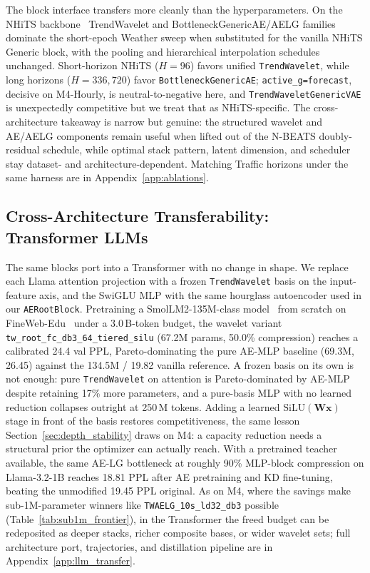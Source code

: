 \documentclass{article}
\begin{document}
The block interface transfers more cleanly than the hyperparameters. On the NHiTS backbone~\citep{challu2023nhits} TrendWavelet and BottleneckGenericAE/AELG families dominate the short-epoch Weather sweep when substituted for the vanilla NHiTS Generic block, with the pooling and hierarchical interpolation schedules unchanged. Short-horizon NHiTS ($H=96$) favors unified \texttt{TrendWavelet}, while long horizons ($H=336, 720$) favor \texttt{BottleneckGenericAE}; \texttt{active\_g=forecast}, decisive on M4-Hourly, is neutral-to-negative here, and \texttt{TrendWaveletGenericVAE} is unexpectedly competitive but we treat that as NHiTS-specific. The cross-architecture takeaway is narrow but genuine: the structured wavelet and AE/AELG components remain useful when lifted out of the N-BEATS doubly-residual schedule, while optimal stack pattern, latent dimension, and scheduler stay dataset- and architecture-dependent. Matching Traffic horizons under the same harness are in Appendix~\ref{app:ablations}.

\subsection{Cross-Architecture Transferability: Transformer LLMs}
\label{sec:transfer_llm}

The same blocks port into a Transformer with no change in shape. We replace each Llama attention projection with a frozen \texttt{TrendWavelet} basis on the input-feature axis, and the SwiGLU MLP with the same hourglass autoencoder used in our \texttt{AERootBlock}. Pretraining a SmolLM2-135M-class model~\citep{allal2025smollm2} from scratch on FineWeb-Edu~\citep{penedo2024fineweb} under a 3.0\,B-token budget, the wavelet variant \texttt{tw\_root\_fc\_db3\_64\_tiered\_silu} (67.2M params, 50.0\% compression) reaches a calibrated 24.4 val PPL, Pareto-dominating the pure AE-MLP baseline (69.3M, 26.45) against the 134.5M / 19.82 vanilla reference. A frozen basis on its own is not enough: pure \texttt{TrendWavelet} on attention is Pareto-dominated by AE-MLP despite retaining 17\% more parameters, and a pure-basis MLP with no learned reduction collapses outright at 250\,M tokens. Adding a learned $\mathrm{SiLU}(\mathbf{W}\mathbf{x})$ stage in front of the basis restores competitiveness, the same lesson Section~\ref{sec:depth_stability} draws on M4: a capacity reduction needs a structural prior the optimizer can actually reach. With a pretrained teacher available, the same AE-LG bottleneck at roughly 90\% MLP-block compression on Llama-3.2-1B reaches 18.81 PPL after AE pretraining and KD fine-tuning, beating the unmodified 19.45 PPL original. As on M4, where the savings make sub-1M-parameter winners like \texttt{TWAELG\_10s\_ld32\_db3} possible (Table~\ref{tab:sub1m_frontier}), in the Transformer the freed budget can be redeposited as deeper stacks, richer composite bases, or wider wavelet sets; full architecture port, trajectories, and distillation pipeline are in Appendix~\ref{app:llm_transfer}.
\end{document}
